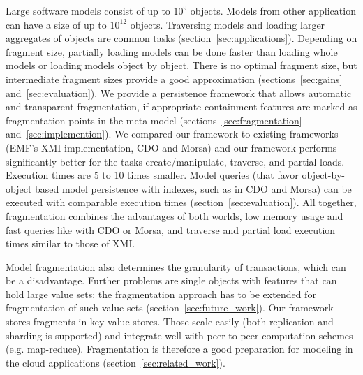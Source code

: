 Large software models consist of up to $10^9$ objects. Models from other application can have a size of up to $10^{12}$ objects. Traversing models and loading larger aggregates of objects are common tasks (section~\ref{sec:applications}). Depending on fragment size, partially loading models can be done faster than loading whole models or loading models object by object. There is no optimal fragment size, but intermediate fragment sizes provide a good approximation  (sections~\ref{sec:gains} and~\ref{sec:evaluation}). We provide a persistence framework that allows automatic and transparent fragmentation, if appropriate containment features are marked as fragmentation points in the meta-model (sections~\ref{sec:fragmentation} and~\ref{sec:implemention}). We compared our framework to existing frameworks (EMF's XMI implementation, CDO and Morsa) and our framework performs significantly better for the tasks create/manipulate, traverse, and partial loads. Execution times are 5 to 10 times smaller. Model queries (that favor object-by-object based model persistence with indexes, such as in CDO and Morsa) can be executed with comparable execution times (section~\ref{sec:evaluation}). All together, fragmentation combines the advantages of both worlds, low memory usage and fast queries like with CDO or Morsa, and traverse and partial load execution times similar to those of XMI.   

Model fragmentation also determines the granularity of transactions, which can be a disadvantage. Further problems are single objects with features that can hold large value sets; the fragmentation approach has to be extended for fragmentation of such value sets (section~\ref{sec:future_work}). Our framework stores fragments in key-value stores. Those scale easily (both replication and sharding is supported) and integrate well with peer-to-peer computation schemes (e.g. map-reduce). Fragmentation is therefore a good preparation for modeling in the cloud applications (section~\ref{sec:related_work}). 